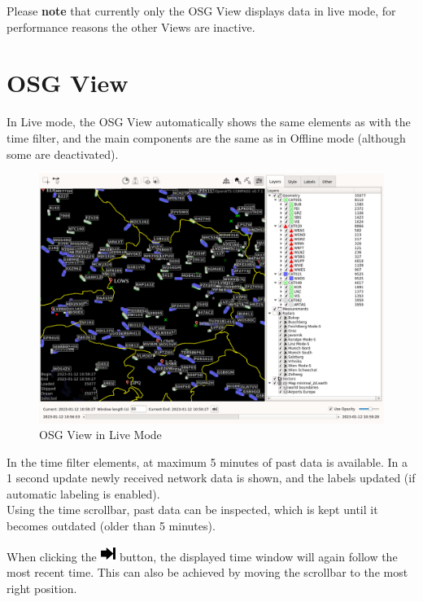Please \textbf{note} that currently only the OSG View displays data in live mode, for performance reasons the other Views are inactive.

\section{OSG View}

In Live mode, the OSG View automatically shows the same elements as with the time filter, and the main components are the same as in Offline mode (although some are deactivated).

\begin{figure}[H]
    \hspace*{-2.5cm}
    \includegraphics[width=19cm,frame]{figures/osg_live_mode.png}
  \caption{OSG View in Live Mode}
\end{figure} 

In the time filter elements, at maximum 5 minutes of past data is available. In a 1 second update newly received network data is shown, and the labels updated (if automatic labeling is enabled). \\

Using the time scrollbar, past data can be inspected, which is kept until it becomes outdated (older than 5 minutes).

When clicking the \includegraphics[width=0.5cm,frame]{../../data/icons/right.png} button, the displayed time window will again follow the most recent time. This can also be achieved by moving the scrollbar to the most right position.

